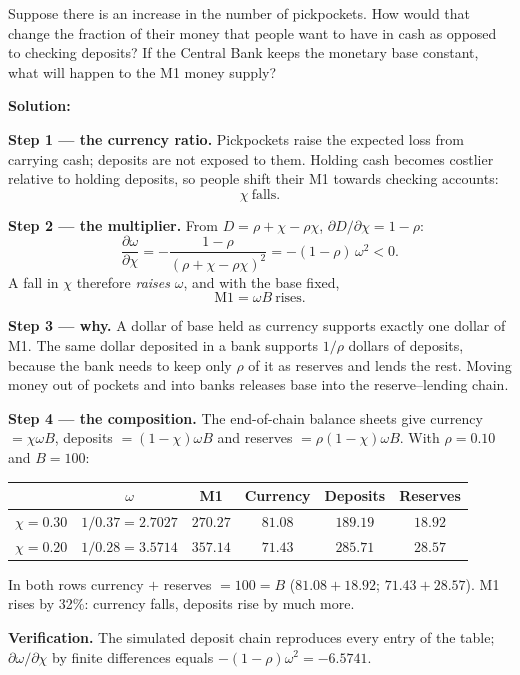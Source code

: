 \documentclass[12pt, letterpaper]{article}
\newcommand{\pd}[2]{\dfrac{\partial #1}{\partial #2}}
\begin{document}
\begin{tcolorbox}[evenbox,title={Problem 10.2 \quad Pickpockets}]
\begin{tcolorbox}[questionbox]
Suppose there is an increase in the number of pickpockets. How would that change the fraction
of their money that people want to have in cash as opposed to checking deposits? If the Central
Bank keeps the monetary base constant, what will happen to the M1 money supply?
\end{tcolorbox}

\textbf{Solution:}

\textbf{Step 1 --- the currency ratio.} Pickpockets raise the expected loss from carrying
cash; deposits are not exposed to them. Holding cash becomes costlier relative to holding
deposits, so people shift their M1 towards checking accounts:
\[
\boxed{\chi\ \text{falls}.}
\]

\textbf{Step 2 --- the multiplier.} From $D=\rho+\chi-\rho\chi$, $\partial D/\partial\chi=1-\rho$:
\[
\pd{\omega}{\chi}=-\frac{1-\rho}{(\rho+\chi-\rho\chi)^{2}}=-(1-\rho)\,\omega^{2}<0 .
\]
A fall in $\chi$ therefore \emph{raises} $\omega$, and with the base fixed,
\[
\boxed{\text{M1}=\omega B\ \text{rises}.}
\]

\textbf{Step 3 --- why.} A dollar of base held as currency supports exactly one dollar of M1.
The same dollar deposited in a bank supports $1/\rho$ dollars of deposits, because the bank
needs to keep only $\rho$ of it as reserves and lends the rest. Moving money out of pockets
and into banks releases base into the reserve--lending chain.

\textbf{Step 4 --- the composition.} The end-of-chain balance sheets give currency
$=\chi\omega B$, deposits $=(1-\chi)\omega B$ and reserves $=\rho(1-\chi)\omega B$.
With $\rho=0.10$ and $B=100$:
\begin{center}
\small
\begin{tabular}{lccccc}
\toprule
 & $\omega$ & M1 & Currency & Deposits & Reserves \\
\midrule
$\chi=0.30$ & $1/0.37=2.7027$ & $270.27$ & $81.08$ & $189.19$ & $18.92$ \\
$\chi=0.20$ & $1/0.28=3.5714$ & $357.14$ & $71.43$ & $285.71$ & $28.57$ \\
\bottomrule
\end{tabular}
\end{center}
In both rows currency $+$ reserves $=100=B$ ($81.08+18.92$; $71.43+28.57$). M1 rises by 32\%:
currency falls, deposits rise by much more.

\smallskip
\textbf{Verification.} The simulated deposit chain reproduces every entry of the table;
$\partial\omega/\partial\chi$ by finite differences equals $-(1-\rho)\omega^2=-6.5741$. \checkmark
\end{tcolorbox}
\end{document}

